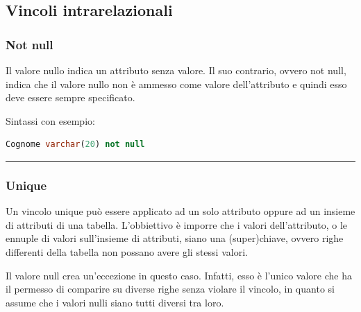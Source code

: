 \documentclass[a4paper]{article}
\newcommand{\longline}{\noindent\rule{\textwidth}{0.4pt}}
\begin{document}
	\subsection{Vincoli intrarelazionali}\label{vincoli intrarelazionali}
	
	\subsubsection{\textsf{Not null}}
	
	Il valore nullo indica un attributo senza valore. Il suo contrario, ovvero \textsf{not null}, indica che il valore nullo non è ammesso come valore dell'attributo e quindi esso deve essere sempre specificato.\newline
	
	\noindent
	Sintassi con esempio:
\begin{lstlisting}[language=SQL]
Cognome varchar(20) not null \end{lstlisting}	
	
	\longline
	
	\subsubsection{\textsf{Unique}}

	Un vincolo \textsf{unique} può essere applicato ad un solo attributo oppure ad un insieme di attributi di una tabella. L'obbiettivo è imporre che i valori dell'attributo, o le ennuple di valori sull'insieme di attributi, siano una (super)chiave, ovvero righe differenti della tabella non possano avere gli stessi valori.

	Il valore \textsf{null} crea un'eccezione in questo caso. Infatti, esso è l'unico valore che ha il permesso di comparire su diverse righe senza violare il vincolo, in quanto si assume che i valori nulli siano tutti diversi tra loro.\newline
\end{document}
